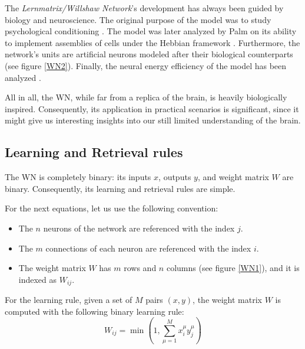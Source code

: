 \documentclass[runningheads]{llncs}
\begin{document}
The \textit{Lernmatrix/Willshaw Network}'s development has always been guided by biology and neuroscience. The original purpose of the model was to study psychological conditioning \cite{steinbuch1961lernmatrix,steinbuch1965automat}.
The model was later analyzed by Palm \cite{palm1982neural} on its ability to implement assemblies of cells under the Hebbian framework \cite{hebb2005organization}.
Furthermore, the network's units are artificial neurons \cite{mcculloch1943logical} modeled after their biological counterparts (see figure \ref{WN2}). Finally, the neural energy efficiency of the model has been analyzed \cite{laughlin2003communication,lennie2003cost}.

All in all, the WN, while far from a replica of the brain, is heavily biologically inspired. Consequently, its application in practical scenarios is significant, since it might give us interesting insights into our still limited understanding of the brain. 

\newpage
\subsection{Learning and Retrieval rules}
\label{sec:wn_rules}
The WN is completely binary: its inputs $x$, outputs $y$, and weight matrix $W$ are binary. Consequently, its learning and retrieval rules are simple.
\newline

For the next equations, let us use the following convention:
\begin{itemize}
    \item The $n$ neurons of the network are referenced with the index $j$.
    \item The $m$ connections of each neuron are referenced with the index $i$.
    \item The weight matrix $W$ has $m$ rows and $n$ columns (see figure \ref{WN1}), and it is indexed as $W_{ij}$.
\end{itemize}

For the learning rule, given a set of $M$ pairs $(x,y)$, the weight matrix $W$ is computed with the following binary learning rule: 
\begin{equation}
W_{i j}=\min \left(1, \sum_{\mu=1}^{M} x_{i}^{\mu} y_{j}^{\mu}\right)
\label{eqn:wn_lrn}
\end{equation}
\newline
\end{document}
